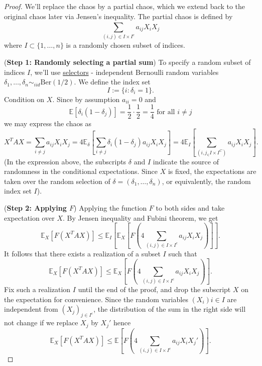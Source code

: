 \begin{proof}
We'll replace the chaos by a partial chaos, which we extend back to the original chaos later via Jensen's 
inequality. The partial chaos is defined by 
\[ \sum_{(i, j) \in I \times I^c}^{} a_{ij}X_iX_j \]
where $I \subset \{1, \dots, n\}$ is a randomly chosen subset of indices.

(\textbf{Step 1: Randomly selecting a partial sum}) To specify a random subset of indices $I$, we'll use 
\underline{selectors} - independent Bernoulli random variables $\delta_1, \dots, \delta_n \sim_{iid} 
\mathrm{Ber}(1/2)$. We define the index set 
\[ I := \{ i: \delta_i = 1 \}. \]
Condition on $X$. Since by assumption $a_{ii} = 0$ and 
\[ \mathbb{E}[\delta_i(1 - \delta_j)] = \frac{1}{2} \cdot \frac{1}{2} = \frac{1}{4} \text{ for all } i \neq j \]
we may express the chaos as 
\[ X^T AX = \sum_{i \neq j}^{} a_{ij} X_iX_j 
= 4 \mathbb{E}_{\delta}\left[ \sum_{i \neq j}^{} \delta_i(1 - \delta_j) a_{ij} X_iX_j \right] 
= 4 \mathbb{E}_I \left[ \sum_{(i, j_ \in I \times I^C)}^{} a_{ij}X_iX_j \right]. \]
(In the expression above, the subscripts $\delta$ and $I$ indicate the source of randomness in the conditional 
expectations. Since $X$ is fixed, the expectations are taken over the random selection of 
$\delta = (\delta_1, \dots, \delta_n)$, or equivalently, the random index set $I$).

(\textbf{Step 2: Applying $F$}) Applying the function $F$ to both sides and take expectation over $X$. By 
Jensen inequality and Fubini theorem, we get 
\[ \mathbb{E}_X[F(X^T AX)] \leq \mathbb{E}_I \left[ \mathbb{E}_X \left[ 
F \left( 4 \sum_{(i, j) \in I \times I^c}^{} a_{ij}X_iX_j \right) \right] \right]. \]
It follows that there exists a realization of a subset $I$ such that 
\[ \mathbb{E}_X[F(X^T AX)] \leq \mathbb{E}_X \left[ 
F \left( 4 \sum_{(i, j) \in I \times I^c}^{} a_{ij}X_iX_j \right) \right]. \]
Fix such a realization $I$ until the end of the proof, and drop the subscript $X$ on the expectation for 
convenience. Since the random variables $(X_i){i \in I}$ are independent from $(X_j)_{j \in I^c}$, the 
distribution of the sum in the right side will not change if we replace $X_j$ by $X_j'$ hence
\[ \mathbb{E}_X[F(X^T AX)] \leq \mathbb{E} \left[ 
F \left( 4 \sum_{(i, j) \in I \times I^c}^{} a_{ij}X_iX_j' \right) \right]. \]


\end{proof}
